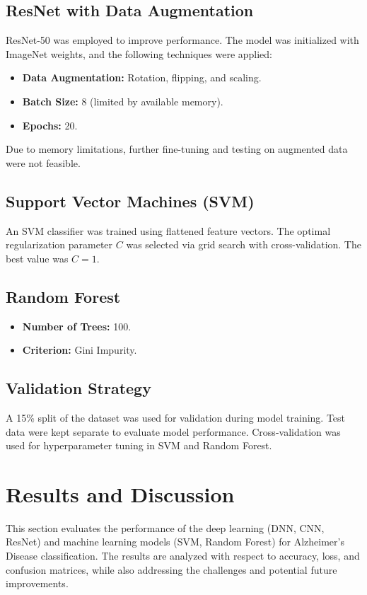 \documentclass[runningheads]{llncs}
\begin{document}
\subsection{ResNet with Data Augmentation}
ResNet-50 was employed to improve performance. The model was initialized with ImageNet weights, and the following techniques were applied:
\begin{itemize}
    \item \textbf{Data Augmentation:} Rotation, flipping, and scaling.
    \item \textbf{Batch Size:} 8 (limited by available memory).
    \item \textbf{Epochs:} 20.
\end{itemize}
Due to memory limitations, further fine-tuning and testing on augmented data were not feasible.

\subsection{Support Vector Machines (SVM)}
An SVM classifier was trained using flattened feature vectors. The optimal regularization parameter \(C\) was selected via grid search with cross-validation. The best value was \(C=1\).

\subsection{Random Forest}
\begin{itemize}
    \item \textbf{Number of Trees:} 100.
    \item \textbf{Criterion:} Gini Impurity.
\end{itemize}

\subsection{Validation Strategy}
A 15\% split of the dataset was used for validation during model training. Test data were kept separate to evaluate model performance. Cross-validation was used for hyperparameter tuning in SVM and Random Forest.

\section{Results and Discussion}

This section evaluates the performance of the deep learning (DNN, CNN, ResNet) and machine learning models (SVM, Random Forest) for Alzheimer’s Disease classification. The results are analyzed with respect to accuracy, loss, and confusion matrices, while also addressing the challenges and potential future improvements.
\end{document}
